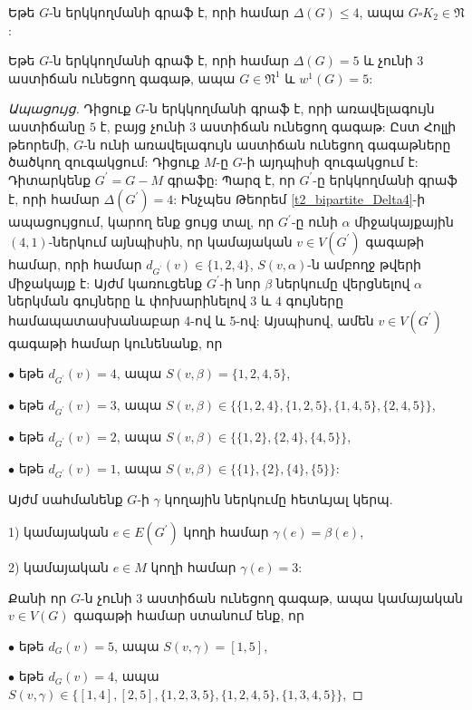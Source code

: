 \begin{hide}
\begin{corollary}
\label{c2_bipartite_Delta4} Եթե $G$-ն երկկողմանի գրաֆ է, որի համար $\Delta(G)\leq
4$, ապա $G\square K_{2}\in \mathfrak{N}$:
\end{corollary}

\begin{theorem}
\label{t2_bipartite_Delta5_no3} Եթե $G$-ն երկկողմանի գրաֆ է, որի համար $\Delta(G)=5$ և չունի $3$ աստիճան ունեցող գագաթ, ապա $G\in \mathfrak{N}^{1}$ և
$w^{1}(G)=5$:
\end{theorem}
\begin{proof}[Ապացույց]
Դիցուք $G$-ն երկկողմանի գրաֆ է, որի առավելագույն աստիճանը $5$ է,
բայց չունի $3$ աստիճան ունեցող գագաթ: Ըստ Հոլլի թեորեմի, $G$-ն ունի առավելագույն աստիճան ունեցող գագաթները ծածկող զուգակցում: Դիցուք $M$-ը $G$-ի այդպիսի զուգակցում է: Դիտարկենք $G^{\prime}=G-M$ գրաֆը:
Պարզ է, որ $G^{\prime}$-ը երկկողմանի գրաֆ է, որի համար
$\Delta(G^{\prime})=4$: Ինչպես Թեորեմ \ref{t2_bipartite_Delta4}-ի ապացույցում, կարող ենք ցույց տալ, որ $G^{\prime}$-ը ունի $\alpha$ միջակայքային $(4,1)$-ներկում այնպիսին, որ կամայական $v\in
V(G^{\prime})$ գագաթի համար, որի համար $d_{G^{\prime}}(v)\in \{1,2,4\}$, $S(v,\alpha)$-ն ամբողջ թվերի միջակայք է: Այժմ կառուցենք $G^{\prime}$-ի նոր $\beta$ ներկումը վերցնելով $\alpha$ ներկման գույները և փոխարինելով 3 և 4 գույները համապատասխանաբար 4-ով և 5-ով: Այսպիսով, ամեն $v\in
V(G^{\prime})$ գագաթի համար կունենանք, որ

$\bullet$ եթե $d_{G^{\prime}}(v)=4$, ապա $S(v,\beta)=
\{1,2,4,5\}$,

$\bullet$ եթե $d_{G^{\prime}}(v)=3$, ապա
$S(v,\beta)\in \{\{1,2,4\},\{1,2,5\},\{1,4,5\},\{2,4,5\}\}$,

$\bullet$ եթե $d_{G^{\prime}}(v)=2$, ապա $S(v,\beta)\in
\{\{1,2\},\{2,4\},\{4,5\}\}$,

$\bullet$ եթե $d_{G^{\prime}}(v)=1$, ապա $S(v,\beta)\in
\{\{1\},\{2\},\{4\},\{5\}\}$:

Այժմ սահմանենք $G$-ի $\gamma$ կողային ներկումը հետևյալ կերպ.

1) կամայական $e\in E(G^{\prime})$ կողի համար $\gamma(e)=\beta(e)$,

2) կամայական $e\in M$ կողի համար $\gamma(e)=3$:

Քանի որ $G$-ն չունի $3$ աստիճան ունեցող գագաթ, ապա կամայական $v\in V(G)$ գագաթի համար ստանում ենք, որ

$\bullet$ եթե $d_{G}(v)=5$, ապա $S(v,\gamma)=[1,5]$,

$\bullet$ եթե $d_{G}(v)=4$, ապա $S(v,\gamma)\in
\{[1,4],[2,5],\{1,2,3,5\},\{1,2,4,5\},\{1,3,4,5\}\}$,


\end{proof}
\end{hide}

